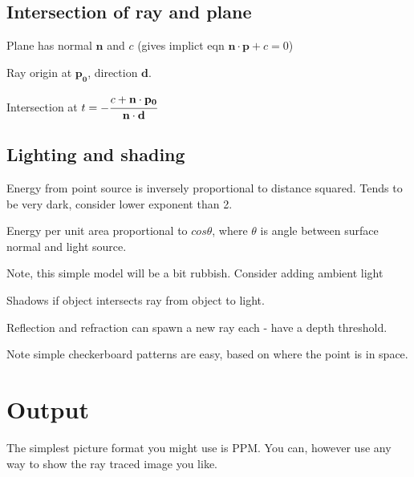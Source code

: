 \documentclass{article}
\begin{document}
        \subsection{Intersection of ray and plane}
            Plane has normal $\mathbf{n}$ and $c$ (gives implict eqn $\mathbf{n}\cdot\mathbf{p}+c=0$)
            
            Ray origin at $\mathbf{p_0}$, direction $\mathbf{d}$.
            
            Intersection at $t = -\cfrac{c + \mathbf{n} \cdot \mathbf{p_0}}{\mathbf{n} \cdot \mathbf{d}}$
            
        \subsection{Lighting and shading}
            Energy from point source is inversely proportional to distance squared.  Tends to be very dark, consider lower exponent than 2.
            
            Energy per unit area proportional to $cos\theta$, where $\theta$ is angle between surface normal and light source.
            
            Note, this simple model will be a bit rubbish.  Consider adding ambient light
            
            Shadows if object intersects ray from object to light.
            
            Reflection and refraction can spawn a new ray each - have a depth threshold.
            
            Note simple checkerboard patterns are easy, based on where the point is in space.
                    
    \section{Output}
        The simplest picture format you might use is PPM.  You can, however use any way to show the ray traced image you like.
        
\end{document}
